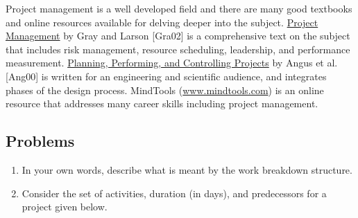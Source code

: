 Project management is a well developed field and there are many good
textbooks and online resources available for delving deeper into the
subject. \ul{Project Management} by Gray and Larson {[}Gra02{]} is a
comprehensive text on the subject that includes risk management,
resource scheduling, leadership, and performance measurement.
\ul{Planning, Performing, and Controlling Projects} by Angus et al.
{[}Ang00{]} is written for an engineering and scientific audience, and
integrates phases of the design process. MindTools
(\href{http://www.mindtools.com}{www.mindtools.com}) is an online
resource that addresses many career skills including project management.

\subsection{Problems}\label{problems}

\begin{enumerate}
\def\labelenumi{\arabic{enumi}.}
\item
  In your own words, describe what is meant by the work breakdown
  structure.
\item
  Consider the set of activities, duration (in days), and predecessors
  for a project given below.
\end{enumerate}

